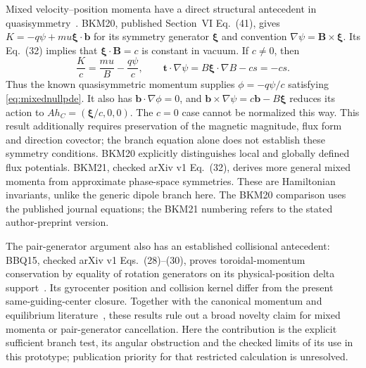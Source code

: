 \documentclass[11pt,letterpaper]{article}
\begin{document}
Mixed velocity--position momenta have a direct structural antecedent in
quasisymmetry~\cite{BKM20,BKM21}. BKM20, published Section~VI Eq.~(41),
gives $K=-q\psi+mu\boldsymbol\xi\cdot\mathbf b$ for its symmetry generator
$\boldsymbol\xi$ and convention $\nabla\psi=\mathbf B\times\boldsymbol\xi$.
Its Eq.~(32) implies that $\boldsymbol\xi\cdot\mathbf B=c$ is constant in
vacuum. If $c\ne0$, then
\begin{equation}
 \frac Kc=\frac{mu}{B}-\frac{q\psi}{c},\qquad
 \mathbf t\cdot\nabla\psi
 =B\boldsymbol\xi\cdot\nabla B-cs=-cs.
\end{equation}
Thus the known quasisymmetric momentum supplies
$\phi=-q\psi/c$ satisfying \eqref{eq:mixednullpde}. It also has
$\mathbf b\cdot\nabla\phi=0$, and
$\mathbf b\times\nabla\psi=c\mathbf b-B\boldsymbol\xi$ reduces its action
to $A h_C=(\boldsymbol\xi/c,0,0)$. The $c=0$ case cannot be normalized
this way. This result additionally requires preservation of the magnetic
magnitude, flux form and direction covector; the branch equation alone
does not establish these symmetry conditions. BKM20 explicitly distinguishes
local and globally defined flux potentials. BKM21, checked arXiv v1
Eq.~(32), derives more general mixed momenta from approximate phase-space
symmetries. These are Hamiltonian invariants, unlike the generic dipole
branch here. The BKM20 comparison uses the published journal equations;
the BKM21 numbering refers to the stated author-preprint version.

The pair-generator argument also has an established collisional antecedent:
BBQ15, checked arXiv v1 Eqs.~(28)--(30), proves toroidal-momentum conservation
by equality of rotation generators on its physical-position delta
support~\cite{BBQ15}. Its gyrocenter position and collision kernel differ
from the present same-guiding-center closure. Together with the canonical
momentum and equilibrium literature~\cite{TB15,DT15}, these results rule out
a broad novelty claim for mixed momenta or pair-generator cancellation.
Here the contribution is the explicit sufficient branch test, its angular
obstruction and the checked limits of its use in this prototype;
publication priority for that restricted calculation is unresolved.
\end{document}

